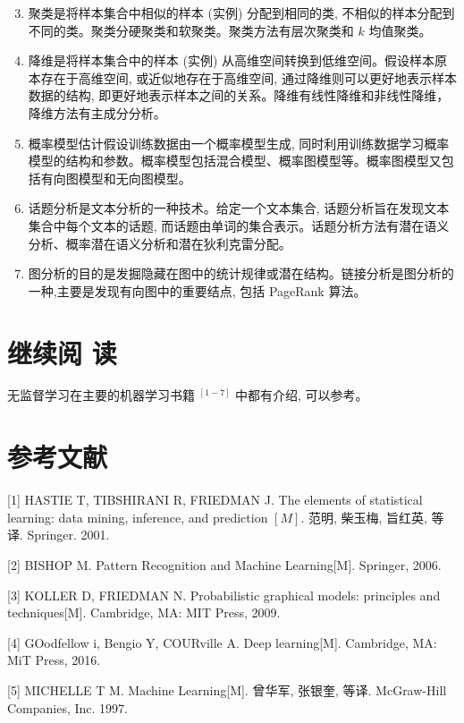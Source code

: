 \documentclass[10pt]{article}
\begin{document}
\begin{CJK*}{UTF8}{bsmi}
\begin{enumerate}
  \setcounter{enumi}{2}
  \item 聚类是将样本集合中相似的样本 (实例) 分配到相同的类, 不相似的样本分配到不同的类。聚类分硬聚类和软聚类。聚类方法有层次聚类和 $k$ 均值聚类。

  \item 降维是将样本集合中的样本 (实例) 从高维空间转换到低维空间。假设样本原本存在于高维空间, 或近似地存在于高维空间, 通过降维则可以更好地表示样本数据的结构, 即更好地表示样本之间的关系。降维有线性降维和非线性降维，降维方法有主成分分析。

  \item 概率模型估计假设训练数据由一个概率模型生成, 同时利用训练数据学习概率模型的结构和参数。概率模型包括混合模型、概率图模型等。概率图模型又包括有向图模型和无向图模型。

  \item 话题分析是文本分析的一种技术。给定一个文本集合, 话题分析旨在发现文本集合中每个文本的话题, 而话题由单词的集合表示。话题分析方法有潜在语义分析、概率潜在语义分析和潜在狄利克雷分配。

  \item 图分析的目的是发掘隐藏在图中的统计规律或潜在结构。链接分析是图分析的一种,主要是发现有向图中的重要结点, 包括 PageRank 算法。

\end{enumerate}

\section*{继续阅 读}
无监督学习在主要的机器学习书籍 ${ }^{[1-7]}$ 中都有介绍, 可以参考。

\section*{参考文献}
[1] HASTIE T, TIBSHIRANI R, FRIEDMAN J. The elements of statistical learning: data mining, inference, and prediction $[M]$. 范明, 柴玉梅, 旨红英, 等译. Springer. 2001.

[2] BISHOP M. Pattern Recognition and Machine Learning[M]. Springer, 2006.

[3] KOLLER D, FRIEDMAN N. Probabilistic graphical models: principles and techniques[M]. Cambridge, MA: MIT Press, 2009.

[4] GOodfellow i, Bengio Y, COURville A. Deep learning[M]. Cambridge, MA: MiT Press, 2016.

[5] MICHELLE T M. Machine Learning[M]. 曾华军, 张银奎, 等译. McGraw-Hill Companies, Inc. 1997.


\end{CJK*}
\end{document}
